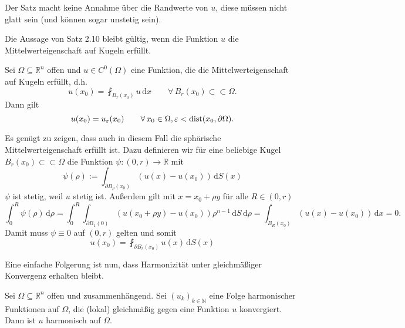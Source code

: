 \begin{bemerkung}
	Der Satz macht keine Annahme über die Randwerte von $u$, diese müssen nicht glatt sein (und können sogar unstetig sein).
\end{bemerkung}

Die Aussage von Satz 2.10 bleibt gültig, wenn die Funktion $u$ die Mittelwerteigenschaft auf Kugeln erfüllt.

\begin{korollar}
	Sei $\Omega \subseteq \mathbb{R}^n$ offen und $u \in C^0(\Omega)$ eine Funktion, die die Mittelwerteigenschaft auf Kugeln erfüllt, d.h.
	\begin{equation}
		u(x_0) = \fint_{B_r(x_0)}^{}u \,\mathrm{d}x \qquad \forall\, B_r(x_0) \subset \subset \Omega.
	\end{equation}
	Dann gilt
	\begin{equation}
		u(x_0) = u_{\varepsilon}(x_0) \qquad \forall\, x_0 \in \Omega, \varepsilon < \operatorname{dist}(x_0,\partial \Omega).
	\end{equation}
\end{korollar}

\begin{beweis}
	Es genügt zu zeigen, dass auch in diesem Fall die sphärische Mittelwerteigenschaft erfüllt ist. 
	Dazu definieren wir für eine beliebige Kugel $B_r(x_0) \subset \subset \Omega$ die Funktion $\psi: (0,r) \to \mathbb{R}$ mit
	\begin{equation}
		\psi(\rho) := \int_{\partial B_{\rho}(x_0)}^{} (u(x)-u(x_0)) \,\mathrm{d}S(x)
	\end{equation}
	$\psi$ ist stetig, weil $u$ stetig ist. 
	Außerdem gilt mit $x= x_0 + \rho y$ für alle $R \in (0,r)$
	\begin{equation}
		\int_{0}^{R} \psi(\rho) \,\mathrm{d}\rho = \int_{0}^{R} \int_{\partial B_1(0)}^{} (u(x_0+\rho y)-u(x_0)) \rho^{n-1} \,\mathrm{d}S \,\mathrm{d}\rho
		= \int_{B_R(x_0)}^{}(u(x)-u(x_0)) \,\mathrm{d}x = 0.
	\end{equation}
	Damit muss $\psi \equiv 0$ auf $(0,r)$ gelten und somit
	\[
		u(x_0) = \fint_{\partial B_r(x_0)}^{} u(x) \,\mathrm{d}S(x)
	\]
\end{beweis}
Eine einfache Folgerung ist nun, dass Harmonizität unter gleichmäßiger Konvergenz erhalten bleibt.

\begin{korollar}
	Sei $\Omega \subseteq \mathbb{R}^n$ offen und zusammenhängend. Sei $(u_k)_{k \in \mathbb{N}}$ eine Folge harmonischer Funktionen auf $\Omega$, die (lokal) gleichmäßig gegen eine Funktion $u$ konvergiert. Dann ist $u$ harmonisch auf $\Omega$.
\end{korollar}

